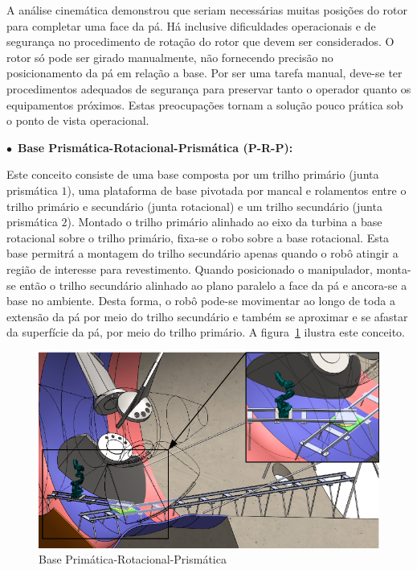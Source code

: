   A análise cinemática demonstrou que seriam necessárias muitas posições do
  rotor para completar uma face da pá. Há inclusive dificuldades operacionais e
  de segurança no procedimento de rotação do rotor que devem ser considerados. O
  rotor só pode ser girado manualmente, não fornecendo precisão no
  posicionamento da pá em relação a base. Por ser uma tarefa manual, deve-se ter
  procedimentos adequados de segurança para preservar tanto o operador quanto os
  equipamentos próximos. Estas preocupações tornam a solução pouco prática sob o
  ponto de vista operacional.

$\bullet$~\textbf{Base Prismática-Rotacional-Prismática (P-R-P):}

  Este conceito consiste de uma base composta por um trilho primário (junta
  prismática $1$), uma plataforma de base pivotada por mancal e rolamentos entre
  o trilho primário e secundário (junta rotacional) e um trilho secundário
  (junta prismática $2$). Montado o trilho primário alinhado ao eixo da turbina
  a base rotacional sobre o trilho primário, fixa-se o robo sobre a base
  rotacional. Esta base permitrá a montagem do trilho secundário apenas quando o
  robô atingir a região de interesse para revestimento. Quando posicionado o
  manipulador, monta-se então o trilho secundário alinhado ao plano paralelo a
  face da pá e ancora-se a base no ambiente. Desta forma, o robô pode-se
  movimentar ao longo de toda a extensão da pá por meio do trilho secundário e
  também se aproximar e se afastar da superfície da pá, por meio do trilho
  primário. A figura~\ref{fig::base_prp} ilustra este conceito.

\begin{figure}[h!]
   \centering
   \includegraphics[width=0.9\columnwidth]{figs/bases/base_prp}
   \caption{Base Primática-Rotacional-Prismática}
   \label{fig::base_prp}
\end{figure}


